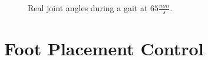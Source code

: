 				\begin{figure}[!h]
					\centering
					\caption{Real joint angles during a gait at $65 \frac{mm}{s}$.}
					\label{fig::real_cpg_joints}
				\end{figure}	



	\section{Foot Placement Control}


